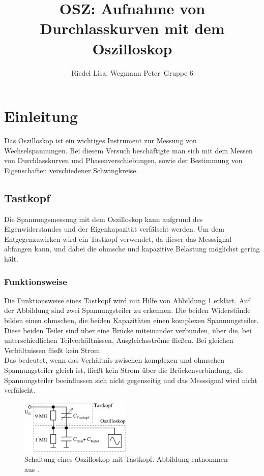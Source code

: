 \documentclass[a4paper,usenatbib]{aspdoc}
\title[]{OSZ: Aufnahme von Durchlasskurven mit dem Oszilloskop}
\author[]{
    Riedel Lisa, Wegmann Peter
    \newauthor
    \,Gruppe 6
}
\begin{document}
    \label{firstpage}
    \pagerange{\pageref{firstpage}--\pageref{lastpage}}
    \maketitle
    
    

    \section{Einleitung}\label{sec:intro}
        Das Oszilloskop ist ein wichtiges Instrument zur Messung von Wechselspannungen. Bei diesem Versuch beschäftigte man sich mit dem Messen von Durchlasskurven und Phasenverschiebungen, sowie der Bestimmung von Eigenschaften verschiedener Schwingkreise.

        \subsection{Tastkopf}
            Die Spannungsmessung mit dem Oszilloskop kann aufgrund des Eigenwiderstandes und der Eigenkapazität verfälscht werden. Um dem Entgegenzuwirken wird ein Tastkopf verwendet, da dieser das Messsignal abfangen kann, und dabei die ohmsche und kapazitive Belastung möglichst gering hält. 
            
            \subsubsection{Funktionsweise}
                Die Funktionsweise eines Tastkopf wird mit Hilfe von Abbildung \ref{fig:tast} erklärt. Auf der Abbildung sind zwei Spannungsteiler zu erkennen. Die beiden Widerstände bilden einen ohmschen, die beiden Kapazitäten einen komplexen Spannungsteiler. Diese beiden Teiler sind über eine Brücke miteinander verbunden, über die, bei unterschiedlichen Teilverhältnissen, Ausgleichsströme fließen. Bei gleichen Verhältnissen fließt kein Strom. \\
                Das bedeutet, wenn das Verhältnis zwischen komplexen und ohmschen Spannungsteiler gleich ist, fließt kein Strom über die Brückenverbindung, die Spannungsteiler beeinflussen sich nicht gegenseitig und das Messsignal wird nicht verfälscht.\\
                \begin{figure}
                    \centering
                        \includegraphics[width=0.47\textwidth]{pictures/tastkopf.png}
                        \caption{Schaltung eines Oszilloskop mit Tastkopf. Abbildung entnommen aus \citep{anleitung}.}
                    \label{fig:tast}
                \end{figure}
            
\end{document}
